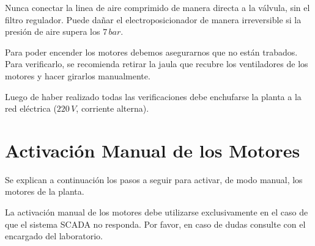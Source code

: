 \begin{lattention}
Nunca conectar la linea de aire comprimido de manera directa a la válvula,
sin el filtro regulador.
Puede dañar el electroposicionador de manera irreversible si la presión de aire
supera los $7\,bar$.
\end{lattention}

\begin{tcolorbox}[title=Motores]
Para poder encender los motores debemos asegurarnos que no están trabados.
Para verificarlo, se recomienda retirar la jaula que recubre los ventiladores
de los motores y hacer girarlos manualmente.
\end {tcolorbox}

\begin{lattention}
Luego de haber realizado todas las verificaciones debe enchufarse la planta a
la red eléctrica ($220\,V$, corriente alterna).
\end{lattention}

\section{Activación Manual de los Motores}
Se explican a continuación los pasos a seguir para activar, de modo manual, los
motores de la planta.
 \begin{lattention}
 La activación manual de los motores debe utilizarse exclusivamente en el caso
de que el sistema SCADA no responda.
Por favor, en caso de dudas consulte con el encargado del laboratorio.
\end{lattention}


